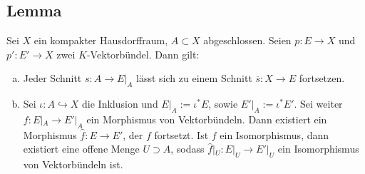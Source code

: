 \subsection[Lemma über Fortsetzungen von Schnitten auf abgeschlossenen Teilmengen]{Lemma} %
\label{sub:27}
Sei $X$ ein kompakter Hausdorffraum, $A \subset X$ abgeschlossen. Seien $p \colon E \to X$ und $p' \colon E' \to X$ zwei $K$-Vektorbündel. Dann gilt:
\begin{enumerate}[a)]
	\item Jeder Schnitt $s \colon A \to E|_A$ lässt sich zu einem Schnitt $\overline{s} \colon X \to E$ fortsetzen.
	\item Sei $\iota \colon A \hookrightarrow X$ die Inklusion und $E|_A := \iota^* E$, sowie $E'|_A := \iota^* E'$. Sei weiter $f \colon E|_A \to E'|_A$ ein Morphismus von 
	Vektorbündeln. Dann existiert ein Morphismus $\hat{f} \colon E \to E'$, der $f$ fortsetzt. Ist $f$ ein Isomorphismus, dann existiert eine offene Menge $U \supset A$, 
	sodass $\hat{f}|_U \colon E|_U \to E'|_U$ ein Isomorphismus von Vektorbündeln ist.
\end{enumerate}
